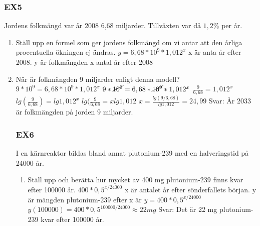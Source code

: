 \documentclass[a4paper,11pt]{article}
\begin{document}
\begin{flushleft}
\subsubsection{EX5}
Jordens folkmängd var år 2008 6,68 miljarder. Tillväxten var då $ 1,2\% $ per år.
\begin{enumerate}
  \item Ställ upp en formel som ger jordens folkmängd om vi antar att den årliga procentuella ökningen ej ändras.\newline
  $ y=6,68*10^9*1,012^x $\newline
  x är anta år efter 2008. y är folkmängden x antal år efter 2008
  \item När är folkmängden 9 miljarder enligt denna modell?\newline
  $ 9*10^9 = 6,68*10^9*1,012^x $\newline
  $ 9*\cancel{10^9} = 6,68*\cancel{10^9}*1,012^x $\newline
  $ \frac{9}{6,68} = 1,012^x $\newline
  $ lg(\frac{9}{6,68}) = lg1,012^x $\newline
  $ lg(\frac{9}{6,68} = xlg1,012 $\newline
  $ x = \frac{lg(9/6,68)}{lg1,012} = 24,99 $\newline
  Svar: År 2033 är folkmängden på jorden 9 miljarder.
  \subsubsection{EX6}
  I en kärnreaktor bildas bland annat plutonium-239 med en halveringstid på 24000 år.
  \begin{enumerate}
    \item Ställ upp och berätta hur mycket av 400 mg plutonium-239 finns kvar efter 100000 år.\newline
    $ 400*0,5^{x/24000} $\newline
    x är antalet år efter sönderfallets början. y är mängden plutonium-239 efter x är
    $ y = 400*0,5^{x/24000} $\newline
    $ y(100000) = 400*0,5^{100000/24000}\approx22mg $
    Svar: Det är 22 mg plutonium-239 kvar efter 100000 år.
  \end{enumerate}

\end{enumerate}
\end{flushleft}
\end{document}
